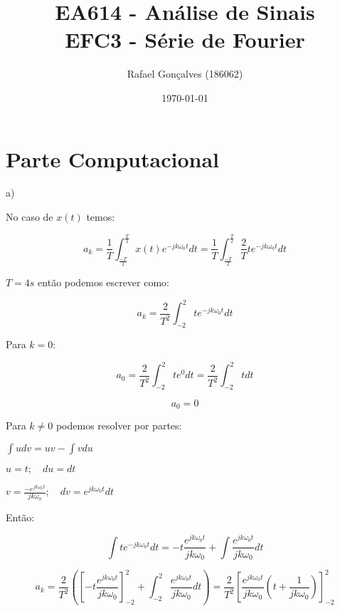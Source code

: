 \documentclass{article}
\begin{document}
\title{EA614 - Análise de Sinais \\
\large{EFC3 - Série de Fourier}}
\author{Rafael Gonçalves (186062)}
\date{\today}

\maketitle

\section{Parte Computacional}

a)

No caso de $x(t)$ temos:

\begin{equation}
a_{k} = \frac{1}{T}\int_{\frac{-T}{2}}^{\frac{T}{2}}x(t)e^{-jk\omega_{0}t}dt = \frac{1}{T}\int_{\frac{-T}{2}}^{\frac{T}{2}}\frac{2}{T}te^{-jk\omega_{0}t}dt
\end{equation}

$T = 4s$ então podemos escrever como:

\begin{equation}
    a_k = \frac{2}{T^{2}}\int_{-2}^{2}te^{-jk\omega_{0}t}dt
\end{equation}

Para $k = 0$:

\begin{equation}
    a_0 = \frac{2}{T^{2}}\int_{-2}^{2}te^{0}dt = \frac{2}{T^{2}}\int_{-2}^{2}tdt 
\end{equation}

\begin{equation}
    a_0 = 0
\end{equation}

Para $k \neq 0$ podemos resolver por partes:

\begin{center}
    $\int u dv = u v - \int v du$\break

    $u = t ; \quad  du = dt$\break

   $v = \frac{-e^{jk\omega_0t}}{jk\omega_0}; \quad dv = e^{jk\omega_0t}dt$
\end{center}

Então:

\begin{equation}
    \int te^{-jk\omega_{0}t}dt = -t \frac{e^{jk\omega_0t}}{jk\omega_0} + \int \frac{e^{jk\omega_0t}}{jk\omega_0} dt 
\end{equation}

\begin{equation}
    a_k = \frac{2}{T^2} \left ( \left [ - t\frac{e^{jk\omega_0t}}{jk\omega_0} \right ]_{-2}^2 + \int_{-2}^2 \frac{e^{jk\omega_0t}}{jk\omega_0}dt \right )= \frac{2}{T^2} \left [ \frac{e^{jk\omega_0t}}{jk\omega_0} \left ( t + \frac{1}{jk\omega_0} \right ) \right ] _{-2}^2
\end{equation}
\end{document}
